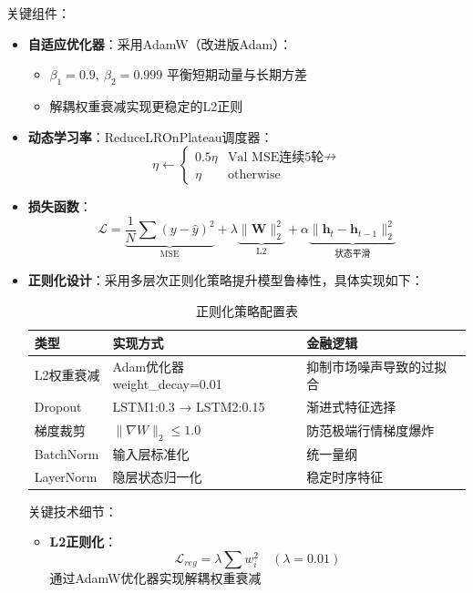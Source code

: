 \documentclass[a4paper,11pt]{ctexart}
\begin{document}
关键组件：
\begin{itemize}
\item \textbf{自适应优化器}：采用AdamW（改进版Adam）：
  \begin{itemize}
  \item $\beta_1=0.9,\ \beta_2=0.999$ 平衡短期动量与长期方差
  \item 解耦权重衰减实现更稳定的L2正则
  \end{itemize}
  
\item \textbf{动态学习率}：ReduceLROnPlateau调度器：
  \[
  \eta \leftarrow \begin{cases}
  0.5\eta & \text{Val MSE连续5轮$\nrightarrow$} \\
  \eta & \text{otherwise}
  \end{cases}
  \]
  
\item \textbf{损失函数}：
  \[
  \mathcal{L} = \underbrace{\frac{1}{N}\sum(y-\hat{y})^2}_{\text{MSE}} + \lambda \underbrace{\|\mathbf{W}\|_2^2}_{\text{L2}} + \alpha \underbrace{\|\mathbf{h}_t-\mathbf{h}_{t-1}\|_2^2}_{\text{状态平滑}}
  \]

  \item \textbf{正则化设计}：采用多层次正则化策略提升模型鲁棒性，具体实现如下：

  \begin{center}
  \begin{table}[h]
  \centering
  \begin{tabular}{lll}
  \toprule
  \textbf{类型} & \textbf{实现方式} & \textbf{金融逻辑} \\
  \midrule
  L2权重衰减 & Adam优化器weight\_decay=0.01 & 抑制市场噪声导致的过拟合 \\
  Dropout & LSTM1:0.3 → LSTM2:0.15 & 渐进式特征选择 \\
  梯度裁剪 & $\|\nabla W\|_2 \leq 1.0$ & 防范极端行情梯度爆炸 \\
  BatchNorm & 输入层标准化 & 统一量纲 \\
  LayerNorm & 隐层状态归一化 & 稳定时序特征 \\
  \bottomrule
  \end{tabular}
  \caption{正则化策略配置表}
  \end{table}
  \end{center}
  
  关键技术细节：
  \begin{itemize}
  \item \textbf{L2正则化}：
    \[
    \mathcal{L}_{reg} = \lambda\sum w_i^2 \quad (\lambda=0.01)
    \]
    通过AdamW优化器实现解耦权重衰减
    

\end{itemize}
\end{itemize}
\end{document}
